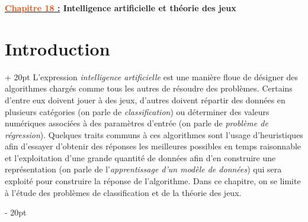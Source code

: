 \documentclass[a4paper, 12pt, twoside]{article}
\newcommand{\Emph}{\textcolor{ff4500}}
\newcommand{\ind}[1][20pt]{\advance\leftskip + #1}
\newcommand{\deind}[1][20pt]{\advance\leftskip - #1}
\newenvironment{indt}[2][20pt]{#2 \par \ind[#1]}{\par \deind} %
\newcommand{\thetitle}[2]{\begin{center}\textbf{{\LARGE \underline{\Emph{#1} :}} {\Large #2}}\end{center}}
\begin{document}
    
    \thetitle{Chapitre 18}{Intelligence artificielle et théorie des jeux}
    
    \tableofcontents
    \listofalgorithms
    \newpage
    
    \begin{indt}{\section{Introduction}}
        L'expression \emph{intelligence artificielle} est une manière floue de désigner des algorithmes chargés comme tous les autres de résoudre des problèmes.
        Certains d'entre eux doivent jouer à des jeux, d'autres doivent répartir des données en plusieurs catégories (on parle de \emph{classification}) ou déterminer des valeurs numériques associées à des paramètres d'entrée (on parle de \emph{problème de régression}).
        Quelques traits communs à ces algorithmes sont l'usage d'heuristiques afin d'essayer d'obtenir des réponses les meilleures possibles en temps raisonnable et l'exploitation d'une grande quantité de données afin d'en construire une représentation (on parle de l'\emph{apprentissage d'un modèle de données}) qui sera exploité pour construire la réponse de l'algorithme.
        Dans ce chapitre, on se limite à l'étude des problèmes de classification et de la théorie des jeux.
    \end{indt}

    \vspace{12pt}
    
\end{document}
